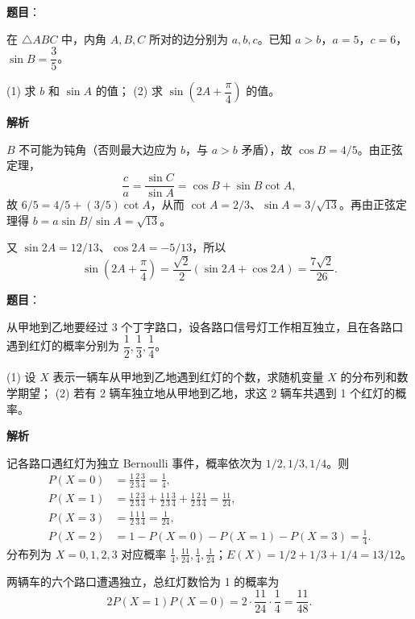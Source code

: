 \begin{answer}

\textbf{题目}：

在 $\triangle ABC$ 中，内角 $A,B,C$ 所对的边分别为 $a,b,c$。已知 $a>b$，$a=5$，$c=6$，$\sin B=\dfrac35$。

(1)   求 $b$ 和 $\sin A$ 的值；
(2)   求 $\sin\left(2A+\dfrac\pi4\right)$ 的值。

\textbf{解析}


$B$ 不可能为钝角（否则最大边应为 $b$，与 $a>b$ 矛盾），故 $\cos B=4/5$。由正弦定理，
\nopagebreak[4]
\[
\frac ca=\frac{\sin C}{\sin A}
=\cos B+\sin B\cot A,
\]
故 $6/5=4/5+(3/5)\cot A$，从而 $\cot A=2/3$、$\sin A=3/\sqrt{13}$。再由正弦定理得 $b=a\sin B/\sin A=\sqrt{13}$。


又 $\sin2A=12/13$、$\cos2A=-5/13$，所以
\nopagebreak[4]
\[
\sin\left(2A+\frac\pi4\right)
=\frac{\sqrt2}{2}(\sin2A+\cos2A)
=\frac{7\sqrt2}{26}.
\]



\end{answer}
\begin{answer}

\textbf{题目}：

从甲地到乙地要经过 3 个丁字路口，设各路口信号灯工作相互独立，且在各路口遇到红灯的概率分别为 $\dfrac12,\dfrac13,\dfrac14$。

(1)   设 $X$ 表示一辆车从甲地到乙地遇到红灯的个数，求随机变量 $X$ 的分布列和数学期望；
(2)   若有 2 辆车独立地从甲地到乙地，求这 2 辆车共遇到 1 个红灯的概率。

\textbf{解析}


记各路口遇红灯为独立 Bernoulli 事件，概率依次为 $1/2,1/3,1/4$。则
\nopagebreak[4]
\[
\begin{aligned}
P(X=0)&=\frac12\frac23\frac34=\frac14,\\
P(X=1)&=\frac12\frac23\frac34+\frac12\frac13\frac34+\frac12\frac23\frac14=\frac{11}{24},\\
P(X=3)&=\frac12\frac13\frac14=\frac1{24},\\
P(X=2)&=1-P(X=0)-P(X=1)-P(X=3)=\frac14.
\end{aligned}
\]
分布列为 $X=0,1,2,3$ 对应概率 $\frac14,\frac{11}{24},\frac14,\frac1{24}$；$E(X)=1/2+1/3+1/4=13/12$。


两辆车的六个路口遭遇独立，总红灯数恰为 1 的概率为
\nopagebreak[4]
\[
2P(X=1)P(X=0)=2\cdot\frac{11}{24}\cdot\frac14=\frac{11}{48}.
\]



\end{answer}
